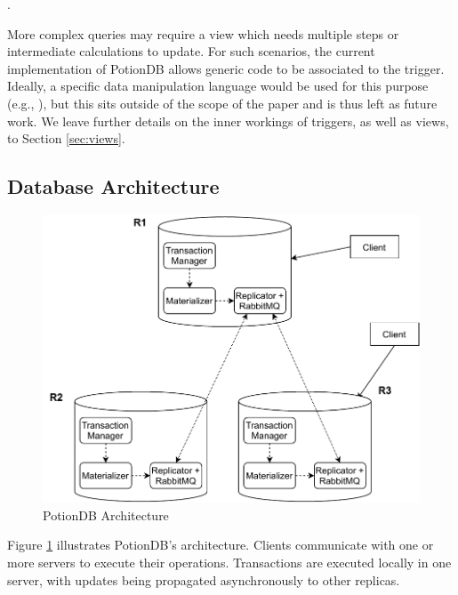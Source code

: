 \documentclass{vldb}
\newcommand{\grumbler}[2]{{\color{red}{\bf #1:} #2}}
\renewcommand{\grumbler}[2]{}
\newcommand{\andre}[1]{\grumbler{andre}{#1}}
\begin{document}
\andre{I added this new paragraph to explain @ custom code}.

More complex queries may require a view which needs multiple steps or intermediate calculations to update.
For such scenarios, the current implementation of PotionDB allows generic code to be associated to the trigger.
Ideally, a specific data manipulation language would be used for this purpose (e.g., \cite{oracleTriggers}), but this sits outside of the scope of the paper and is thus left as future work.
We leave further details on the inner workings of triggers, as well as views, to Section \ref{sec:views}.



%
%


\subsection{Database Architecture} 

\begin{figure}
	\centering
	\includegraphics[width=.95\linewidth]{potiondb_architecture}
	\caption{PotionDB Architecture}
	\label{fig:potiondbArch}
\end{figure}

Figure \ref{fig:potiondbArch} illustrates PotionDB's architecture.
Clients communicate with one or more servers to execute their operations.
Transactions are executed locally in one server, with updates being propagated asynchronously to other replicas.
\end{document}
